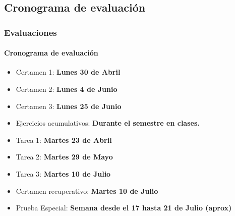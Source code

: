 \documentclass{beamer}
\begin{document}
		\subsection{Cronograma de evaluaci\'on}


		\begin{frame}
			\frametitle{Evaluaciones}
			\framesubtitle{Cronograma de evaluaci\'on}

			\begin{itemize}
				\item Certamen 1: \textbf{Lunes 30 de Abril}
				\item Certamen 2: \textbf{Lunes 4 de Junio}
				\item Certamen 3: \textbf{Lunes 25 de Junio}
				\item Ejercicios acumulativos: \textbf{Durante el semestre en clases.}
				\item Tarea 1: \textbf{Martes 23 de Abril}
				\item Tarea 2: \textbf{Martes 29 de Mayo}
				\item Tarea 3: \textbf{Martes 10 de Julio}
				\item Certamen recuperativo: \textbf{Martes 10 de Julio}
				\item Prueba Especial: \textbf{Semana desde el 17 hasta 21 de Julio (aprox)}
			\end{itemize}

		\end{frame}
\end{document}
